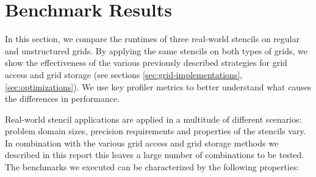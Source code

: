 \chapter{Benchmark Results}    \label{sec:results}

In this section, we compare the runtimes of three real-world stencils on regular and unstructured grids. By applying the same stencils on both types of grids, we show the effectiveness of the various previously described strategies for grid access and grid storage (see sections \ref{sec:grid-implementations}, \ref{sec:optimizations}). We use key profiler metrics to better understand what causes the differences in performance.

Real-world stencil applications are applied in a multitude of different scenarios: problem domain sizes, precision requirements and properties of the stencils vary. In combination with the various grid access and grid storage methods we described in this report this leaves a large number of combinations to be tested. The benchmarks we executed can be characterized by the following properties:

